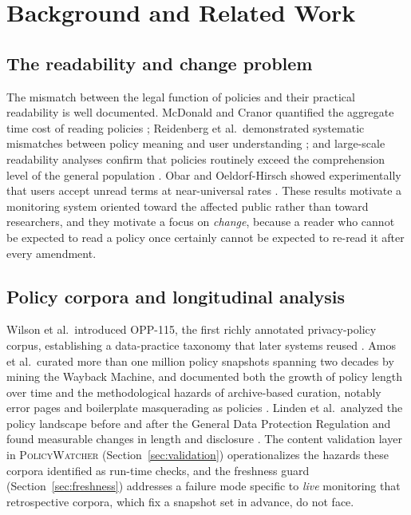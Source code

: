 \documentclass[11pt]{article}
\newcommand{\pw}{\textsc{PolicyWatcher}}
\begin{document}
\section{Background and Related Work}
\label{sec:related}

\subsection{The readability and change problem}
The mismatch between the legal function of policies and their practical
readability is well documented. McDonald and Cranor quantified the aggregate
time cost of reading policies \cite{mcdonald2008cost}; Reidenberg et al.\
demonstrated systematic mismatches between policy meaning and user understanding
\cite{reidenberg2015disagreeable}; and large-scale readability analyses confirm
that policies routinely exceed the comprehension level of the general population
\cite{fabian2017readability}. Obar and Oeldorf-Hirsch showed experimentally that
users accept unread terms at near-universal rates \cite{obar2020biggest}. These
results motivate a monitoring system oriented toward the affected public rather
than toward researchers, and they motivate a focus on \emph{change}, because a
reader who cannot be expected to read a policy once certainly cannot be expected
to re-read it after every amendment.

\subsection{Policy corpora and longitudinal analysis}
Wilson et al.\ introduced OPP-115, the first richly annotated privacy-policy
corpus, establishing a data-practice taxonomy that later systems reused
\cite{wilson2016creation}. Amos et al.\ curated more than one million policy
snapshots spanning two decades by mining the Wayback Machine, and documented both
the growth of policy length over time and the methodological hazards of
archive-based curation, notably error pages and boilerplate masquerading as
policies \cite{amos2021privacy}. Linden et al.\ analyzed the policy landscape
before and after the General Data Protection Regulation and found measurable
changes in length and disclosure \cite{linden2020landscape}. The content
validation layer in \pw{} (Section~\ref{sec:validation}) operationalizes the
hazards these corpora identified as run-time checks, and the freshness guard
(Section~\ref{sec:freshness}) addresses a failure mode specific to \emph{live}
monitoring that retrospective corpora, which fix a snapshot set in advance, do
not face.
\end{document}
